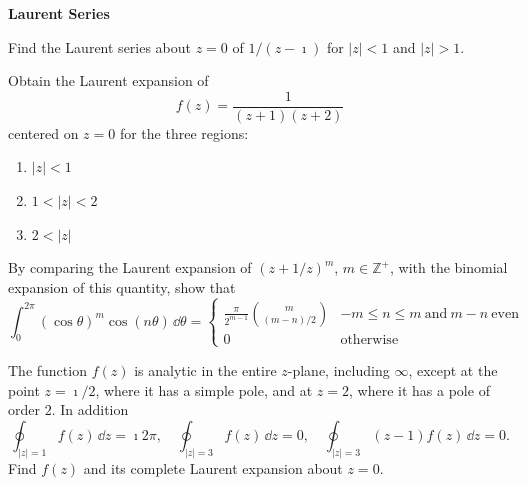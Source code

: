 {\begin{Exercise}
\end{Exercise}




\begin{large}
  \noindent
  \textbf{Laurent Series}
\end{large}


\begin{Exercise}
  \label{exercise laurent 1/(z-i)}
  Find the Laurent series about $z = 0$ of $1/(z - \imath)$ for $|z| < 1$ 
  and $|z| > 1$.

\end{Exercise}



\begin{Exercise}
  \label{exercise laurent 1/((z+1)(z+2))}
  Obtain the Laurent expansion of
  \[
  f(z) = \frac{1}{(z + 1) (z + 2)}
  \]
  centered on $z = 0$ for the three regions:
  \begin{enumerate}
  \item $\displaystyle |z| < 1$
  \item $\displaystyle 1 < |z| < 2$
  \item $\displaystyle 2 < |z|$
  \end{enumerate}

\end{Exercise}


\begin{Exercise}
  \label{exercise int (cos t)^m cos nt}
  By comparing the Laurent expansion of $(z + 1/z)^m$, $m \in \mathbb{Z}^+$,
  with the binomial expansion of this quantity, show that
  \[
  \int_0^{2\pi} (\cos \theta)^m \cos(n \theta)\,\dd \theta =
  \begin{cases}
    \frac{\pi}{2^{m-1}} \binom{m}{(m - n)/2}  
    &-m \leq n \leq m\ \mathrm{and}\ m-n\ \mathrm{even} 
    \\
    0                                  &\mathrm{otherwise}
  \end{cases}
  \]

\end{Exercise}


\begin{Exercise}
  \label{exercise int f = i 2 pi}
  The function $f(z)$ is analytic in the entire $z$-plane, including $\infty$,
  except at the point $z = \imath / 2$, where it has a simple pole, and at $z = 2$, 
  where it has a pole of order $2$.  In addition
  \[
  \oint_{|z| = 1} f(z)\,\dd z = \imath 2 \pi, \quad
  \oint_{|z| = 3} f(z)\,\dd z = 0, \quad
  \oint_{|z| = 3} (z-1) f(z)\,\dd z = 0.
  \]
  Find $f(z)$ and its complete Laurent expansion about $z = 0$.


\end{Exercise}}
